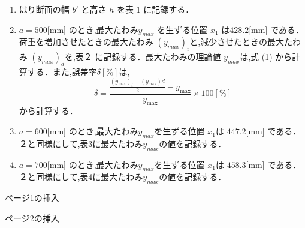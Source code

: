 \documentclass[a4paper,11pt]{jsarticle}
\begin{document}
\begin{enumerate}
  \item はり断面の幅 $b'$ と高さ $h$ を表 1 に記録する．
  \item $a = 500 $[mm] のとき,最大たわみ$y_{max}$ を生ずる位置 $x_1$ は$ 428.2 $[mm] である．
        荷重を増加させたときの最大たわみ $(y_{max})_i$と,減少させたときの最大たわみ $(y_{max})_d$を,表２
        に記録する．最大たわみの理論値 $y_{max}$は,式 (1) から計算する．また,誤差率$ \delta [\%]$は,
        \begin{equation}
          \delta = \frac{{\frac{{(y_{\text{max}})_i + (y_{\text{max}})d}}{2} - y_{\text{max}}}}{{y_{\text{max}}}} \times 100[\%]
        \end{equation}
        から計算する．
  \item $a = 600 $[mm] のとき,最大たわみ$ y_{max}$を生ずる位置 $x_1$は $447.2 $[mm] である．
        ２と同様にして,表3に最大たわみ$y_{max}$の値を記録する．
  \item $a = 700 $[mm] のとき,最大たわみ$ y_{max}$を生ずる位置 $x_1$は $458.3 $[mm] である．
        ２と同様にして,表4に最大たわみ$y_{max}$の値を記録する．
\end{enumerate}

\clearpage
ページ1の挿入

\clearpage

ページ2の挿入
\clearpage
\end{document}
